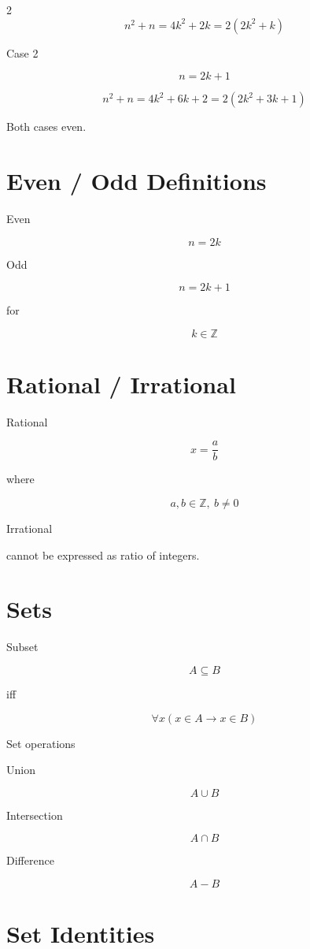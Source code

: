 \documentclass[9pt]{article}
\begin{document}
\begin{multicols}{2}
\[
n^2+n=4k^2+2k=2(2k^2+k)
\]

Case 2

\[
n=2k+1
\]

\[
n^2+n=4k^2+6k+2=2(2k^2+3k+1)
\]

Both cases even.

\section*{Even / Odd Definitions}

Even

\[
n=2k
\]

Odd

\[
n=2k+1
\]

for

\[
k\in\mathbb{Z}
\]

\section*{Rational / Irrational}

Rational

\[
x=\frac ab
\]

where

\[
a,b\in\mathbb Z,\ b\neq0
\]

Irrational

cannot be expressed as ratio of integers.

\section*{Sets}

Subset

\[
A\subseteq B
\]

iff

\[
\forall x(x\in A\rightarrow x\in B)
\]

Set operations

Union

\[
A\cup B
\]

Intersection

\[
A\cap B
\]

Difference

\[
A-B
\]

\section*{Set Identities}


\end{multicols}
\end{document}
